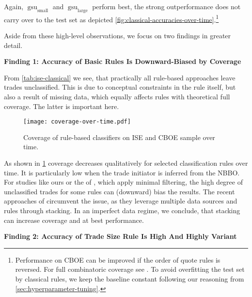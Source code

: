 Again, $\operatorname{gsu}_{\mathrm{small}}$ and $\operatorname{gsu}_{\mathrm{large}}$ perform best, the strong outperformance does not carry over to the test set as depicted \cref{fig:classical-accuracies-over-time}.\footnote{Performance on \gls{CBOE} can be improved if the order of quote rules is reversed. For full combinatoric coverage see \textcite[][33]{grauerOptionTradeClassification2022}. To avoid overfitting the test set by classical rules, we keep the baseline constant following our reasoning from \cref{sec:hyperparameter-tuning}.}

Aside from these high-level observations, we focus on two findings in greater detail.


\textbf{Finding 1: Accuracy of Basic Rules Is Downward-Biased by Coverage}

From \cref{tab:ise-classical} we see, that practically all rule-based approaches leave trades unclassified. This is due to conceptual constraints in the rule itself, but also a result of missing data, which equally affects rules with theoretical full coverage. The latter is important here.

\begin{figure}[!h]
    \centering
    \texttt{[image: coverage-over-time.pdf]}
    \caption[Coverage Of Rule-Based Classifiers On  and  Over Time]{Coverage of rule-based classifiers on \gls{ISE} and \gls{CBOE} sample over time.}
    \label{fig:classical-coverage-over-time}
\end{figure}

As shown in \cref{fig:classical-coverage-over-time} coverage decreases qualitatively for selected classification rules over time. It is particularly low when the trade initiator is inferred from the \gls{NBBO}. For studies like ours or the of \textcites{grauerOptionTradeClassification2022}[][887]{savickasInferringDirectionOption2003}, which apply minimal filtering, the high degree of unclassified trades for some rules can (downward) bias the results. The recent approaches of \textcite[][18--19]{grauerOptionTradeClassification2022} circumvent the issue, as they leverage multiple data sources and rules through stacking. In an imperfect data regime, we conclude, that stacking can increase coverage and at best performance.

\textbf{Finding 2: Accuracy of Trade Size Rule Is High And Highly Variant}

